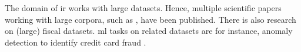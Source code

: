 The domain of \ac{ir} works with large datasets.
Hence, multiple scientific papers working with large corpora, such as \cite{WordRep2013}, have been published.
There is also research on (large) fiscal datasets.
\ac{ml} tasks on related datasets are for instance, anomaly detection to identify credit card fraud
\cite{credit_f_SOM2006, fd_ARIMA2021, cf_AE2020, AE_RF2021, dt_svm_2012, kaggle_ex2017}.